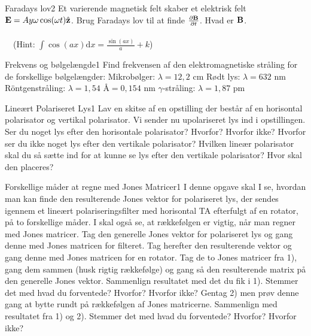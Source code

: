 \begin{opgave}{Faradays lov}{2}
Et varierende magnetisk felt skaber et elektrisk felt $\mathbf{E} =Ay\omega\cos (\omega t)\hat{\mathbf{z}}$.
\opg Brug Faradays lov til at finde $\frac{\partial \mathbf{B}}{\partial t}$.
\opg Hvad er $\mathbf{B}$.
\\\\~~(Hint: $\int \cos(ax)\mathrm{d}x=\frac{\sin(ax)}{a}+k$)
\end{opgave}

\begin{opgave}{Frekvens og bølgelængde}{1}
Find frekvensen af den elektromagnetiske stråling for de forskellige bølgelængder:
\opg Mikrobølger: $\lambda = 12,2\text{ cm}$
\opg Rødt lys: $\lambda = 632\text{ nm}$
\opg Röntgenstråling: $\lambda = 1,54\text{ Å}=0,154\text{ nm}$
\opg $\gamma$-stråling: $\lambda = 1,87\text{ pm}$
\end{opgave}

\begin{opgave}{Lineært Polariseret Lys}{1}
Lav en skitse af en opstilling der består af en horisontal polarisator og vertikal polarisator. Vi sender nu upolariseret lys ind i opstillingen. 
\opg Ser du noget lys efter den horisontale polarisator? Hvorfor? Hvorfor ikke?
\opg Hvorfor ser du ikke noget lys efter den vertikale polarisator? 
\opg Hvilken lineær polarisator skal du så sætte ind for at kunne se lys efter den vertikale polarisator? Hvor skal den placeres? 
\end{opgave}

\begin{opgave}{Forskellige måder at regne med Jones Matricer}{1}
I denne opgave skal I se, hvordan man kan finde den resulterende Jones vektor for polariseret lys, der sendes igennem et lineært polariseringsfilter med horisontal TA efterfulgt af en rotator, på to forskellige måder. I skal også se, at rækkefølgen er vigtig, når man regner med Jones matricer.  
\opg Tag den generelle Jones vektor for polariseret lys og gang denne med Jones matricen for filteret. Tag herefter den resulterende vektor og gang denne med Jones matricen for en rotator.
\opg Tag de to Jones matricer fra 1), gang dem sammen (husk rigtig rækkefølge) og gang så den resulterende matrix på den generelle Jones vektor. Sammenlign resultatet med det du fik i 1). Stemmer det med hvad du forventede? Hvorfor? Hvorfor ikke?
\opg Gentag 2) men prøv denne gang at bytte rundt på rækkefølgen af Jones matricerne. Sammenlign med resultatet fra 1) og 2). Stemmer det med hvad du forventede? Hvorfor? Hvorfor ikke?    
\end{opgave}

